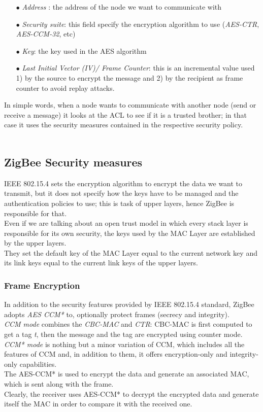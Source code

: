 \documentclass[12pt]{report}
\begin{document}
{\begin{itemize}
\setlength{\itemindent}{+4mm}
\item[$\bullet$] \emph{Address }: the address of the node we want to communicate with
\item[$\bullet$] \emph{Security suite}: this field specify the encryption algorithm to use (\emph{AES-CTR}, \emph{AES-CCM-32}, etc)
\item[$\bullet$] \emph{Key}: the key used in the AES algorithm
\item[$\bullet$] \emph{Last Initial Vector (IV)/ Frame Counter}: this is an incremental value used 1) by the source to encrypt the message and 2) by the recipient as frame counter to avoid replay attacks.\\
\end{itemize}

In simple words, when a node wants to communicate with another node (send or receive a message) it looks at the ACL to see if it is a trusted brother; in that case it uses the security measures contained in the respective security policy.\\\\

\subsection{ZigBee Security measures}
\bigskip
IEEE 802.15.4 sets the encryption algorithm to encrypt the data we want to transmit, but it does not specify how the keys have to be managed and the authentication policies to use; this is task of upper layers, hence ZigBee is responsible for that.\\
Even if we are talking about an open trust model in which every stack layer is responsible for its own security, the keys used by the MAC Layer are established by the upper layers.\\
They set the default key of the MAC Layer equal to the current network key and its link keys equal to the current link keys of the upper layers.

\subsubsection{Frame Encryption}
\bigskip
In addition to the security features provided by IEEE 802.15.4 standard,  ZigBee adopts \emph{AES CCM*} to, optionally protect frames (secrecy and integrity).\\
\emph{CCM mode} combines the \emph{CBC-MAC} and \emph{CTR}: CBC-MAC is first computed to get a tag \emph{t}, then the message and the tag are encrypted using counter mode.\\
\emph{CCM* mode} is nothing but a minor variation of CCM, which includes all the features of CCM and, in addition to them, it offers encryption-only and integrity-only capabilities.\\
The AES-CCM* is used to encrypt the data and generate an associated MAC, which is sent along with the frame.\\
Clearly, the receiver uses AES-CCM* to decrypt the encrypted data and generate itself the MAC in order to compare it with the received one.

}
\end{document}
